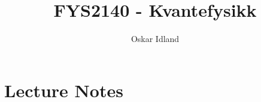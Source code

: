 \documentclass[12pt]{report}
\author{Oskar Idland}
\title{FYS2140 - Kvantefysikk}
\date{}
\begin{document}
\maketitle
\newpage
\tableofcontents
\newpage



\part{Lecture Notes}









\end{document}
